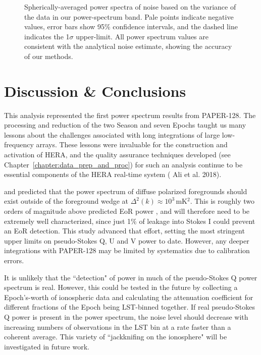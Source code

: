 \begin{figure}
\begin{tabular}{ll}
\end{tabular}
\caption[Spherically-averaged noise power spectra.]{Spherically-averaged power spectra of noise based on the variance of the data in our power-spectrum band. Pale points indicate negative values, error bars show 95\% confidence intervals, and the dashed line indicates the 1$\sigma$ upper-limit. All power spectrum values are consistent with the analytical noise estimate, showing the accuracy of our methods.}
\label{fig:psa128_power_spectra_noise}
\end{figure}

\section{Discussion \& Conclusions}
\label{sec:psa128_conc}

This analysis represented the first power spectrum results from PAPER-128. The processing and reduction of the two Season and seven Epochs taught us many lessons about the challenges associated with long integrations of large low-frequency arrays. These lessons were invaluable for the construction and activation of HERA, and the quality assurance techniques developed (see Chapter~\ref{chapter:data_prep_and_proc}) for such an analysis continue to be essential components of the HERA real-time system ({\color{red} Ali et al. 2018}).

\cite{Nunhokee.17} and \cite{Asad.15} predicted that the power spectrum of diffuse polarized foregrounds should exist outside of the foreground wedge at $\Delta^2(k)\approx10^3$\,mK$^2$. This is roughly two orders of magnitude above predicted EoR power \citep{Lidz.07}, and will therefore need to be extremely well characterized, since just 1\% of leakage into Stokes I could prevent an EoR detection. This study advanced that effort, setting the most stringent upper limits on pseudo-Stokes Q, U and V power to date. However, any deeper integrations with PAPER-128 may be limited by systematics due to calibration errors. 

It is unlikely that the ``detection" of power in much of the pseudo-Stokes Q power spectrum is real. However, this could be tested in the future by collecting a Epoch's-worth of ionospheric data and calculating the attenuation coefficient for different fractions of the Epoch being LST-binned together. If real pseudo-Stokes Q power is present in the power spectrum, the noise level should decrease with increasing numbers of observations in the LST bin at a rate faster than a coherent average. This variety of ``jackknifing on the ionosphere" will be investigated in future work.
